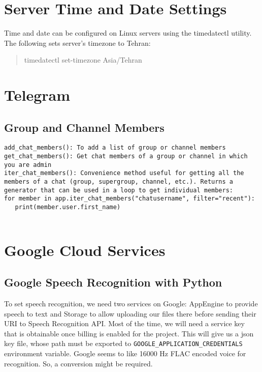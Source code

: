 \documentclass{article}
\begin{document}
\section{Server Time and Date Settings}
Time and date can be configured on Linux servers using the timedatectl utility. The following sets server's timezone to Tehran:
\begin{verse}
timedatectl set-timezone Asia/Tehran
\end{verse}

\section{Telegram}
\subsection{Group and Channel Members}
\begin{verbatim}
add_chat_members(): To add a list of group or channel members
get_chat_members(): Get chat members of a group or channel in which you are admin
iter_chat_members(): Convenience method useful for getting all the members of a chat (group, supergroup, channel, etc.). Returns a generator that can be used in a loop to get individual members:   
for member in app.iter_chat_members("chatusername", filter="recent"):
   print(member.user.first_name)


\end{verbatim}

\section{Google Cloud Services}
\subsection{Google Speech Recognition with Python}
To set speech recognition, we need two services on Google: AppEngine to provide speech to text and Storage to allow uploading our files there before sending their URI to Speech Recognition API.  Most of the time, we will need a service key that is obtainable once billing is enabled for the project. This will give us a json key file, whose path must be exported to \lstinline{GOOGLE_APPLICATION_CREDENTIALS} environment variable. Google seems to like 16000 Hz FLAC encoded voice for recognition. So, a conversion might be required. 
\end{document}
